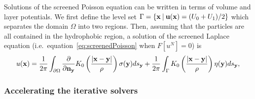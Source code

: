 Solutions of the screened Poisson equation can be written
in terms of volume and layer potentials. We first define the level set
$\Gamma = \{\mathbf{x} \:|\: \mathbf{u}(\mathbf{x}) = (U_0 + U_1)/2 \}$ which separates the
domain $\Omega$ into two regions. Then, assuming that the particles are
all contained in the hydrophobic region, a solution of the screened
Laplace equation (i.e.~equation~\eqref{eq:screenedPoisson} when $F[u^N]
= 0$) is
\begin{align*}
  u(\mathbf{x}) = \frac{1}{2\pi} \int_{\partial\Omega} \frac{\partial }{\partial \mathbf{n}_{\mathbf{y}}} K_0 \left(
    \frac{|\mathbf{x} - \mathbf{y}|}{\rho}\right) \sigma(\mathbf{y}) ds_{\mathbf{y}} + 
    \frac{1}{2\pi} \int_{\Gamma} K_0 \left(
    \frac{|\mathbf{x} - \mathbf{y}|}{\rho} \right) \eta(\mathbf{y}) ds_{\mathbf{y}},
\end{align*}



\subsubsection{Accelerating the iterative solvers}
\label{subsec:NumericalIssues}

